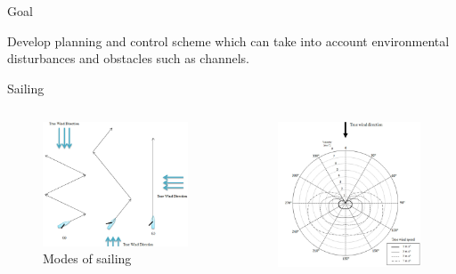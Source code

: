 \documentclass[10pt,xcolor={table,dvipsnames},t]{beamer}
\begin{document}
\begin{frame}{Goal}

Develop planning and control scheme which can take into account environmental disturbances and obstacles such as channels.

\end{frame}
  

\begin{frame}{Sailing}
\begin{columns}

\begin{figure}
    \centering
    \includegraphics[width=\linewidth]{documents/figures/alves_modes.png}
    \caption{Modes of sailing \cite{Alves2010}}
    \label{fig:alves_modes}
\end{figure}
\begin{figure}
    \centering
    \includegraphics[width=\linewidth]{documents/figures/alves_vpp.png}

\end{figure}
\end{columns}
\end{frame}
\end{document}
